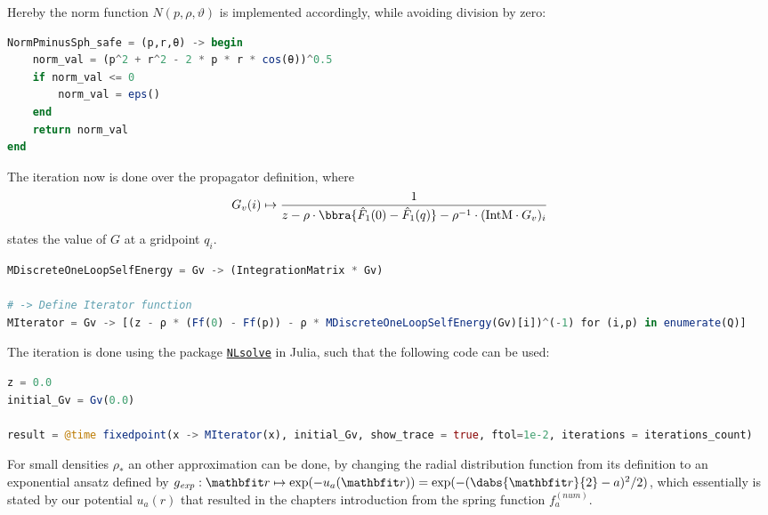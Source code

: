 Hereby the norm function $N(p,\rho,\vartheta)$ is implemented accordingly, while avoiding division by zero:
\begin{mdframed}[backgroundcolor=black!4, topline=false, bottomline=false, rightline=false, leftline=false]
    \begin{lstlisting}[language=Julia,basicstyle=\small]
NormPminusSph_safe = (p,r,θ) -> begin
	norm_val = (p^2 + r^2 - 2 * p * r * cos(θ))^0.5
	if norm_val <= 0
		norm_val = eps()
	end
	return norm_val
end
    \end{lstlisting}
\end{mdframed}
The iteration now is done over the propagator definition, where 
\[
    G_v(i)\mapsto \frac{1}{
        z - \rho\cdot\bbra{\hat F_1(0) - \hat F_1(q)} - \rho^{-1}\cdot(\text{IntM}\cdot G_v)_i
    }
\]
states the value of $G$ at a gridpoint $q_i$. 
\begin{mdframed}[backgroundcolor=black!4, topline=false, bottomline=false, rightline=false, leftline=false]
    \begin{lstlisting}[language=Julia,basicstyle=\small]
MDiscreteOneLoopSelfEnergy = Gv -> (IntegrationMatrix * Gv)

# -> Define Iterator function
MIterator = Gv -> [(z - ρ * (Ff(0) - Ff(p)) - ρ * MDiscreteOneLoopSelfEnergy(Gv)[i])^(-1) for (i,p) in enumerate(Q)]
    \end{lstlisting}
\end{mdframed}
The iteration is done using the package \href{https://github.com/JuliaNLSolvers/NLsolve.jl}{\texttt{NLsolve}} in Julia, such that the following code can be used:
\begin{mdframed}[backgroundcolor=black!4, topline=false, bottomline=false, rightline=false, leftline=false]
    \begin{lstlisting}[language=Julia,basicstyle=\small]
z = 0.0
initial_Gv = Gv(0.0)

result = @time fixedpoint(x -> MIterator(x), initial_Gv, show_trace = true, ftol=1e-2, iterations = iterations_count)
    \end{lstlisting}
\end{mdframed}

For small densities $\rho_*$ an other approximation can be done, by changing the radial distribution function from its definition to an exponential ansatz defined by $g_{\mathit{exp}}:\vr\mapsto \exp(-u_a(\vr)) = \exp(-(\dabs{\vr}{2} - a)^2/2)$, which essentially is stated by our potential $u_a(r)$ that resulted in the chapters introduction from the spring function $f_a^{(\textit{num})}$. \\

